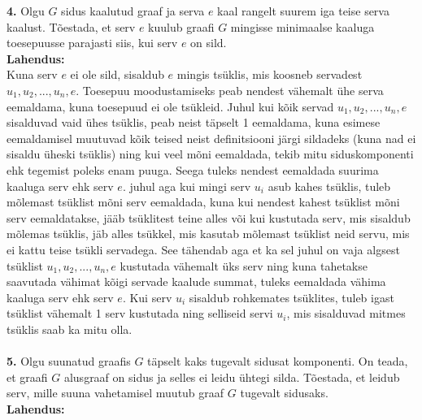 \documentclass{article}
\begin{document}
\textbf{4.} Olgu $G$ sidus kaalutud graaf ja serva $e$ kaal rangelt suurem iga teise serva kaalust. T\~oestada, et serv $e$ kuulub graafi $G$ mingisse minimaalse kaaluga toesepuusse parajasti siis, kui serv $e$ on sild.\\
\textbf{Lahendus:}\\
Kuna serv $e$ ei ole sild, sisaldub $e$ mingis ts\"uklis, mis koosneb servadest $u_1, u_2, ... , u_n, e$. Toesepuu moodustamiseks peab nendest v\"ahemalt \"uhe serva eemaldama, kuna toesepuud ei ole ts\"ukleid. Juhul kui k\~oik servad $u_1, u_2, ... , u_n, e$ sisalduvad vaid \"uhes ts\"uklis, peab neist t\"apselt 1 eemaldama, kuna esimese eemaldamisel muutuvad k\~oik teised neist definitsiooni j\"argi sildadeks (kuna nad ei sisaldu \"uheski ts\"uklis) ning kui veel m\~oni eemaldada, tekib mitu siduskomponenti ehk tegemist poleks enam puuga. Seega tuleks nendest eemaldada suurima kaaluga serv ehk serv $e$. juhul aga kui mingi serv $u_i$ asub kahes ts\"uklis, tuleb m\~olemast ts\"uklist m\~oni serv eemaldada, kuna kui nendest kahest ts\"uklist m\~oni serv eemaldatakse, j\"a\"ab ts\"uklitest teine alles v\~oi kui kustutada serv, mis sisaldub m\~olemas ts\"uklis, j\"ab alles ts\"ukkel, mis kasutab m\~olemast ts\"uklist neid servu, mis ei kattu teise ts\"ukli servadega. See t\"ahendab aga et ka sel juhul on vaja algsest ts\"uklist $u_1, u_2, ... , u_n, e$ kustutada v\"ahemalt \"uks serv ning kuna tahetakse saavutada v\"ahimat k\~oigi servade kaalude summat, tuleks eemaldada v\"ahima kaaluga serv ehk serv $e$. Kui serv $u_i$ sisaldub rohkemates ts\"uklites, tuleb igast ts\"uklist v\"ahemalt 1 serv kustutada ning selliseid servi $u_i$, mis sisalduvad mitmes ts\"uklis saab ka mitu olla.
\\\\
\textbf{5.} Olgu suunatud graafis $G$ t\"apselt kaks tugevalt sidusat komponenti. On teada, et graafi $G$ alusgraaf on sidus ja selles ei leidu \"uhtegi silda. T\~oestada, et leidub serv, mille suuna vahetamisel muutub graaf $G$ tugevalt sidusaks.\\
\textbf{Lahendus:}\\
\end{document}
